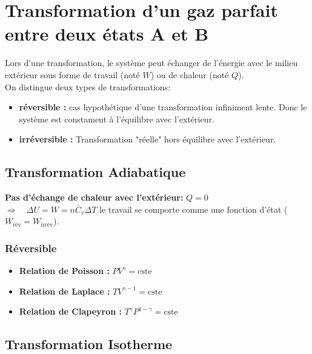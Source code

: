 \documentclass[a4paper,12pt]{article}
\newcommand{\re}{\textrm}
\newcommand{\Cv}{\overline{C}_v} %
\begin{document}
\clearpage

\section{Transformation d'un gaz parfait entre deux états A et B}

    Lors d'une transformation, le système peut échanger de l'énergie avec le milieu extérieur
    sous forme de travail (noté $W$) ou de chaleur (noté $Q$).\\
    On distingue deux types de transformations:
    \begin{itemize}
        \item \textbf{réversible :} cas hypothétique d'une transformation infiniment lente. Donc le système est constament à l'équilibre avec l'extérieur.
        \item \textbf{irréversible :} Transformation "réelle" hors équilibre avec l'extérieur.
    \end{itemize}


    \subsection{Transformation Adiabatique}

        \textbf{Pas d'échange de chaleur avec l'extérieur:} $\boxed{Q = 0}$\\ 
        $ \Longrightarrow \quad \Delta U = W = n\Cv\Delta T $ \quad le travail se comporte comme une fonction d'état ($W_{\text{rév}} = W_{\text{irrév}}$).

        \subsubsection{Réversible}

            \begin{itemize}[label=\textbullet]
                \item \textbf{Relation de Poisson :} $PV^\gamma = \re{cste}$
                \item \textbf{Relation de Laplace :} $T V^{\gamma - 1} = \re{cste}$
                \item \textbf{Relation de Clapeyron :} $T^\gamma P^{1 - \gamma} = \re{cste}$
            \end{itemize}

    \subsection{Transformation Isotherme}
\end{document}
